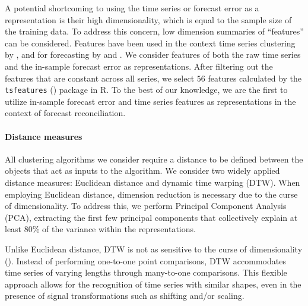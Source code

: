 \documentclass[a4paper,review,12pt,authoryear]{elsarticle}
\let\code=\texttt
\begin{document}
A potential shortcoming to using the time series or forecast error as a representation is their high dimensionality, which is equal to the sample size of the training data. To address this concern, low dimension summaries of ``features'' can be considered. Features have been used in the context
time series clustering by \cite{tianoFeatTSFeaturebasedTime2021}, and for forecasting by \cite{wangUncertaintyEstimationFeaturebased2022} and \cite{ liFeaturebasedIntermittentDemand2023}. 
We consider features of both the raw time series and the in-sample forecast error as representations. After filtering out the features that are constant across all series, we select $56$ features calculated by the \code{tsfeatures} (\citealp{tsfeatures}) package in R. %
To the best of our knowledge, we are the first to utilize in-sample forecast error and time series features as representations in the context of forecast reconciliation.

\paragraph{\textbf{Distance measures}}

All clustering algorithms we consider require a distance to be defined between the objects that act as inputs to the algorithm.
We consider two widely applied distance measures: Euclidean distance and dynamic time warping (DTW). When employing Euclidean distance, dimension reduction is necessary due to the curse of dimensionality. %
To address this, we perform Principal Component Analysis (PCA), extracting the first few principal components that collectively explain at least 80\% of the variance within the representations.

Unlike Euclidean distance, DTW is not as sensitive to the curse of dimensionality (\citealp{sakoeDynamicProgrammingAlgorithm1978}). Instead of performing one-to-one point comparisons, DTW accommodates time series of varying lengths through many-to-one comparisons. This flexible approach allows for the recognition of time series with similar shapes, even in the presence of signal transformations such as shifting and/or scaling.
\end{document}
